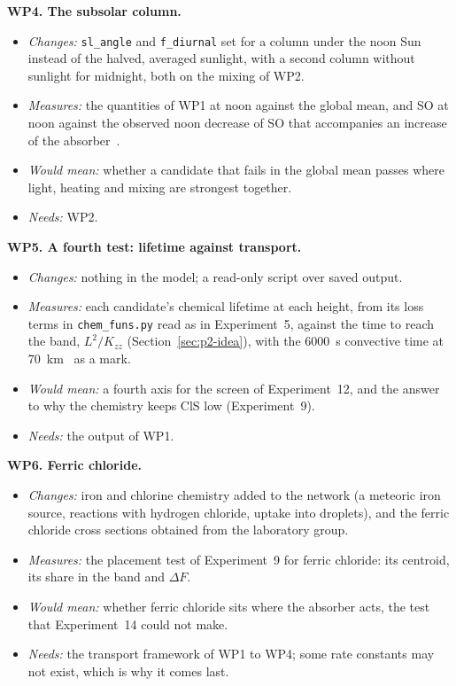 \textbf{WP4. The subsolar column.}
\nopagebreak[4]
\begin{itemize}[leftmargin=*, itemsep=1pt, topsep=2pt]
  \item \emph{Changes:} \texttt{sl\_angle} and \texttt{f\_diurnal} set for a column
    under the noon Sun instead of the halved, averaged sunlight, with a second column
    without sunlight for midnight, both on the mixing of WP2.
  \item \emph{Measures:} the quantities of WP1 at noon against the global mean, and
    SO at noon against the observed noon decrease of SO that accompanies an
    increase of the absorber~\cite{lefevre2022}.
  \item \emph{Would mean:} whether a candidate that fails in the global mean passes
    where light, heating and mixing are strongest together.
  \item \emph{Needs:} WP2.
\end{itemize}

\textbf{WP5. A fourth test: lifetime against transport.}
\nopagebreak[4]
\begin{itemize}[leftmargin=*, itemsep=1pt, topsep=2pt]
  \item \emph{Changes:} nothing in the model; a read-only script over saved output.
  \item \emph{Measures:} each candidate's chemical lifetime at each height, from its
    loss terms in \texttt{chem\_funs.py} read as in Experiment~5, against the time to
    reach the band, $L^{2}/K_{zz}$ (Section~\ref{sec:p2-idea}), with the 6000~s
    convective time at 70~km~\cite{lefevre2022} as a mark.
  \item \emph{Would mean:} a fourth axis for the screen of Experiment~12, and the answer
    to why the chemistry keeps ClS low (Experiment~9).
  \item \emph{Needs:} the output of WP1.
\end{itemize}

\textbf{WP6. Ferric chloride.}
\nopagebreak[4]
\begin{itemize}[leftmargin=*, itemsep=1pt, topsep=2pt]
  \item \emph{Changes:} iron and chlorine chemistry added to the network (a meteoric
    iron source, reactions with hydrogen chloride, uptake into droplets), and the
    ferric chloride cross sections obtained from the laboratory group.
  \item \emph{Measures:} the placement test of Experiment~9 for ferric chloride: its
    centroid, its share in the band and $\Delta F$.
  \item \emph{Would mean:} whether ferric chloride sits where the absorber acts, the
    test that Experiment~14 could not make.
  \item \emph{Needs:} the transport framework of WP1 to WP4; some rate constants may not
    exist, which is why it comes last.
\end{itemize}

